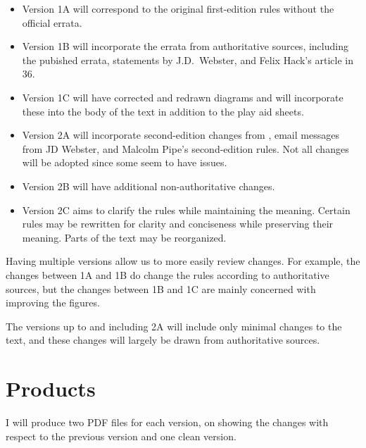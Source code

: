 \documentclass[10pt]{article}
\begin{document}
\begin{itemize}
    \item Version 1A will correspond to the original first-edition rules without the official errata.
    \item Version 1B will incorporate the errata from authoritative sources, including the pubished errata, statements by J.D.\ Webster, and Felix Hack’s article in {\APJ} 36.
    \item Version 1C will have corrected and redrawn diagrams and will incorporate these into the body of the text in addition to the play aid sheets.
    \item Version 2A will incorporate second-edition changes from {\APJ}, email messages from JD Webster, and  Malcolm Pipe’s second-edition rules. Not all changes will be adopted since some seem to have issues.
    \item Version 2B will have additional non-authoritative changes.
    \item Version 2C aims to clarify the rules while maintaining the meaning. Certain rules may be rewritten for clarity and conciseness while preserving their meaning. Parts of the text may be reorganized.
\end{itemize}

Having multiple versions allow us to more easily review changes. For example, the changes between 1A and 1B do change the rules according to authoritative sources, but the changes between 1B and 1C are mainly concerned with improving the figures.

The versions up to and including 2A will include only minimal changes to the text, and these changes will largely be drawn from authoritative sources. 


\section{Products}

I will produce two PDF files for each version, on showing the changes with respect to the previous version and one clean version.

\end{document}
